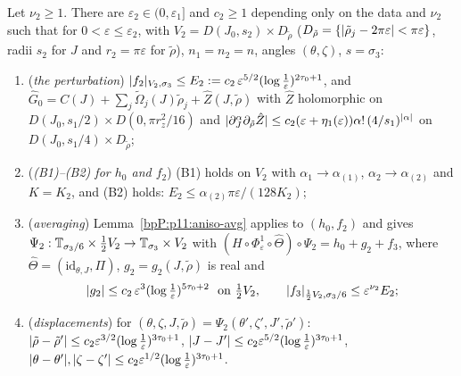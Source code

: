 \begin{proposition}\label{bpP:p11:avg-slow}
Let $\nu_2\ge1$. There are $\varepsilon_2\in(0,\varepsilon_1]$ and $c_2\ge1$ depending only on the data and $\nu_2$ such that for $0<\varepsilon\le\varepsilon_2$, with $V_2=D(J_0,s_2)\times D_{\tilde\rho}$ ($D_{\tilde\rho}=\{\lvert \tilde\rho_j-2\pi\varepsilon\rvert<\pi\varepsilon\}$, radii $s_2$ for $J$ and $r_2=\pi\varepsilon$ for $\tilde\rho$), $n_1=n_2=n$, angles $(\theta,\zeta)$, $s=\sigma_3$:
\begin{enumerate}[label=(\alph*)]
\item (\emph{the perturbation}) $\lvert f_2\rvert_{V_2,\sigma_3}\le E_2:=c_2\,\varepsilon^{5/2}(\log\frac1\varepsilon)^{2\tau_0+1}$, and $\hat G_0=C(J)+\sum_j\tilde\Omega_j(J)\tilde\rho_j+\hat Z(J,\tilde\rho)$ with $\hat Z$ holomorphic on $D(J_0,s_1/2)\times D(0,\pi r_z^2/16)$ and $\lvert \partial_J^\alpha\partial_{\tilde\rho}\hat Z\rvert\le c_2(\varepsilon+\eta_1(\varepsilon))\alpha!\,(4/s_1)^{\lvert \alpha\rvert}$ on $D(J_0,s_1/4)\times D_{\tilde\rho}$;
\item (\emph{(B1)--(B2) for $h_0$ and $f_2$}) (B1) holds on $V_2$ with $\alpha_1\to\alpha_{(1)}$, $\alpha_2\to\alpha_{(2)}$ and $K=K_2$, and (B2) holds: $E_2\le\alpha_{(2)}\pi\varepsilon/(128K_2)$;
\item (\emph{averaging}) Lemma~\ref{bpP:p11:aniso-avg} applies to $(h_0,f_2)$ and gives $\Psi_2:\mathbb{T}_{\sigma_3/6}\times\tfrac12V_2\to\mathbb{T}_{\sigma_3}\times V_2$ with $(H\circ\Phi^1_\varepsilon\circ\hat\Theta)\circ\Psi_2=h_0+g_2+f_3$, where $\hat\Theta=(\mathrm{id}_{\theta,J},\Pi)$, $g_2=g_2(J,\tilde\rho)$ is real and
\[\lvert g_2\rvert\le c_2\,\varepsilon^{3}(\log\tfrac1\varepsilon)^{5\tau_0+2}\ \text{ on }\tfrac12V_2,\qquad\lvert f_3\rvert_{\frac12V_2,\sigma_3/6}\le\varepsilon^{\nu_2}E_2;\]
\item (\emph{displacements}) for $(\theta,\zeta,J,\tilde\rho)=\Psi_2(\theta',\zeta',J',\tilde\rho')$: $\lvert \tilde\rho-\tilde\rho'\rvert\le c_2\varepsilon^{3/2}(\log\frac1\varepsilon)^{3\tau_0+1}$, $\lvert J-J'\rvert\le c_2\varepsilon^{5/2}(\log\frac1\varepsilon)^{3\tau_0+1}$, $\lvert \theta-\theta'\rvert,\lvert \zeta-\zeta'\rvert\le c_2\varepsilon^{1/2}(\log\frac1\varepsilon)^{3\tau_0+1}$.
\end{enumerate}
\end{proposition}
